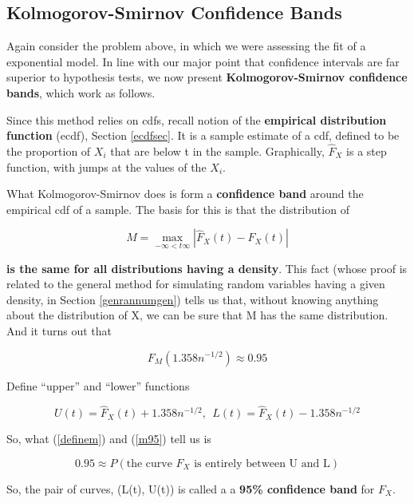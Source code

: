 
\subsection{Kolmogorov-Smirnov Confidence Bands}
\label{kolsmi}

Again consider the problem above, in which we were assessing the fit of
a exponential model.  In line with our major point that confidence
intervals are far superior to hypothesis tests, we now present {\bf
Kolmogorov-Smirnov confidence bands}, which work as follows.

Since this method relies on cdfs, recall  
notion of the {\bf empirical distribution function} (ecdf), Section
\ref{ecdfsec}.
It is a sample estimate of a cdf, defined to be the proportion
of $X_i$ that are below t in the sample.  Graphically, $\widehat{F}_X$
is a step function, with jumps at the values of the $X_i$.

What Kolmogorov-Smirnov does is form a {\bf confidence band} around the
empirical cdf of a sample.  The basis for this is that the distribution
of

\begin{equation}
\label{definem}
M = \max_{-\infty < t \infty} |\widehat{F}_X(t) - F_X(t)|
\end{equation}

{\bf is the same for all distributions having a density}.  This 
fact (whose proof is related to the general method for simulating random
variables having a given density, in Section \ref{genrannumgen})
tells us that, without knowing anything about the distribution of
X, we can be sure that M has the same distribution.  And it turns out
that

\begin{equation}
\label{m95}
F_M(1.358 n^{-1/2}) \approx 0.95
\end{equation}

Define ``upper'' and ``lower'' functions

\begin{equation}
U(t) = \widehat{F}_X(t) + 1.358 n^{-1/2}, ~~
L(t) = \widehat{F}_X(t) - 1.358 n^{-1/2}
\end{equation}

So, what (\ref{definem}) and (\ref{m95}) tell us is

\begin{equation}
0.95 \approx P \left (\textrm{the curve } F_X \textrm{ is entirely between U
and L} \right ) 
\end{equation}

So, the pair of curves, (L(t), U(t)) is called a a {\bf 95\% confidence
band} for $F_X$. 

